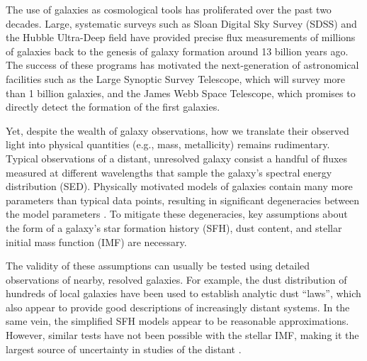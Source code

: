 \documentclass[11pt,preprint]{aastex}
\begin{document}
The use of galaxies as cosmological tools has proliferated over the past two decades.  Large, systematic surveys such as Sloan Digital Sky Survey (SDSS) and the Hubble Ultra-Deep field have provided precise flux measurements of millions of galaxies back to the genesis of galaxy formation around 13 billion years ago.  The success of these programs has motivated the next-generation of astronomical facilities such as the Large Synoptic Survey Telescope, which will survey more than 1 billion galaxies, and the James Webb Space Telescope, which promises to directly detect the formation of the first galaxies.

Yet, despite the wealth of galaxy observations, how we translate their observed light into physical quantities (e.g., mass, metallicity) remains rudimentary.  Typical observations of a distant, unresolved galaxy consist a handful of fluxes measured at different wavelengths that sample the galaxy's spectral energy distribution (SED).  Physically motivated models of galaxies contain many more parameters than typical data points, resulting in significant degeneracies between the model parameters \citep[e.g.,][]{conroy2013}. To mitigate these degeneracies, key assumptions about the form of a galaxy's star formation history (SFH), dust content, and stellar initial mass function (IMF) are necessary.  

The validity of these assumptions can usually be tested using detailed observations of nearby, resolved galaxies.  For example, the dust distribution of hundreds of local galaxies have been used to establish analytic dust ``laws'', which also appear to provide good descriptions of increasingly distant systems.  In the same vein, the simplified SFH models appear to be reasonable approximations.  However, similar tests have not been possible with the stellar IMF, making it the largest source of uncertainty in studies of the distant \citep[e.g.,][]{cool2008, conroy2013}.
\end{document}
